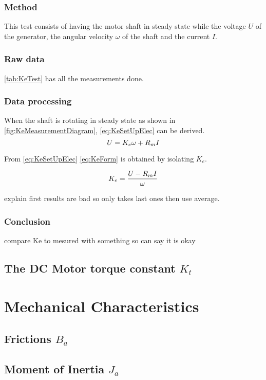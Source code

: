 \subsubsection*{Method}
This test consists of having the motor shaft in steady state while the voltage $U$ of the generator, the angular velocity $\omega$ of the shaft and the current $I$.

\subsubsection*{Raw data}
\autoref{tab:KeTest} has all the measurements done.


\subsubsection*{Data processing}

When the shaft is rotating in steady state as shown in \autoref{fig:KeMeasurementDiagram}, \autoref{eq:KeSetUpElec} can be derived.
\begin{equation}
U=K_e\omega+R_m I \addunit{V}
\label{eq:KeSetUpElec}
\end{equation}
\startexplain
{}
\stopexplain

From \autoref{eq:KeSetUpElec} \autoref{eq:KeForm} is obtained by isolating $K_e$.

\begin{equation}
K_e=\frac{U-R_m I}{\omega} \addunit{\volt\per\radian\second}
\label{eq:KeForm}
\end{equation}

explain first results are bad so only takes last ones then use average.

\subsubsection*{Conclusion}

compare Ke to mesured with something so can say it is okay

\subsection{The DC Motor torque constant $K_t$}


\section{Mechanical Characteristics}
\subsection{Frictions $B_a$}

\subsection{Moment of Inertia $J_a$}
